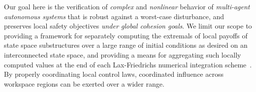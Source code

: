 %
Our goal here is the verification of  \textit{complex} and \textit{nonlinear} behavior of  \textit{multi-agent autonomous systems} that is robust against a worst-case disturbance, and preserves local safety objectives \textit{under global cohesion goals}. We limit our scope to providing a framework for separately computing the extremals of local payoffs of state space substructures over a large range of initial conditions as desired on an interconnected state space,   and providing a means for aggregating such locally computed values at the end of each Lax-Friedrichs numerical integration scheme~\cite{Crandall1984Approx, OsherShuENO}. By properly coordinating local control laws, coordinated influence across workspace regions can be exerted over a wider range.  %



